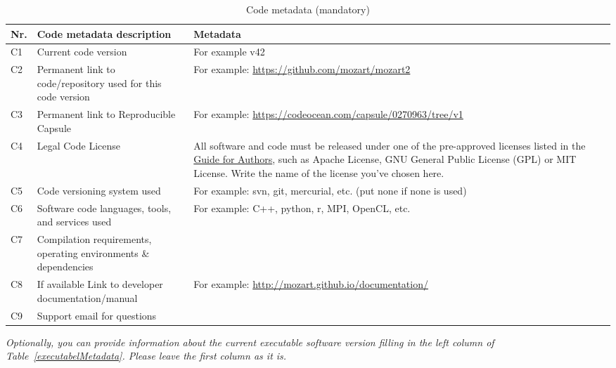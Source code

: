 \documentclass[preprint,12pt, a4paper]{elsarticle}
\begin{document}
\begin{table}[!h]
\begin{tabular}{|l|p{6.5cm}|p{6.5cm}|}
\hline
\textbf{Nr.} & \textbf{Code metadata description} & \textbf{Metadata} \\
\hline
C1 & Current code version & For example v42 \\
\hline
C2 & Permanent link to code/repository used for this code version & For example: \url{https://github.com/mozart/mozart2} \\
\hline
C3  & Permanent link to Reproducible Capsule & For example: \url{https://codeocean.com/capsule/0270963/tree/v1}\\
\hline
C4 & Legal Code License   & All software and code must be released under one of the pre-approved licenses listed in the \href{https://www.elsevier.com/journals/softwarex/2352-7110/guide-for-authors}{Guide for Authors}, such as Apache License, GNU General Public License (GPL) or MIT License. Write the name of the license you’ve chosen here. \\
\hline
C5 & Code versioning system used & For example: svn, git, mercurial,
                                   etc. (put none if none is used) \\
\hline
C6 & Software code languages, tools, and services used & For example: C++, python, r, MPI, OpenCL, etc. \\
\hline
C7 & Compilation requirements, operating environments \& dependencies & \\
\hline
C8 & If available Link to developer documentation/manual & For example: \url{http://mozart.github.io/documentation/} \\
\hline
C9 & Support email for questions & \\
\hline
\end{tabular}
\caption{Code metadata (mandatory)}
\label{codeMetadata} 
\end{table}

\textit{Optionally, you can provide information about the current executable
software version filling in the left column of
Table~\ref{executabelMetadata}. Please leave the first column as it is.}
\end{document}
